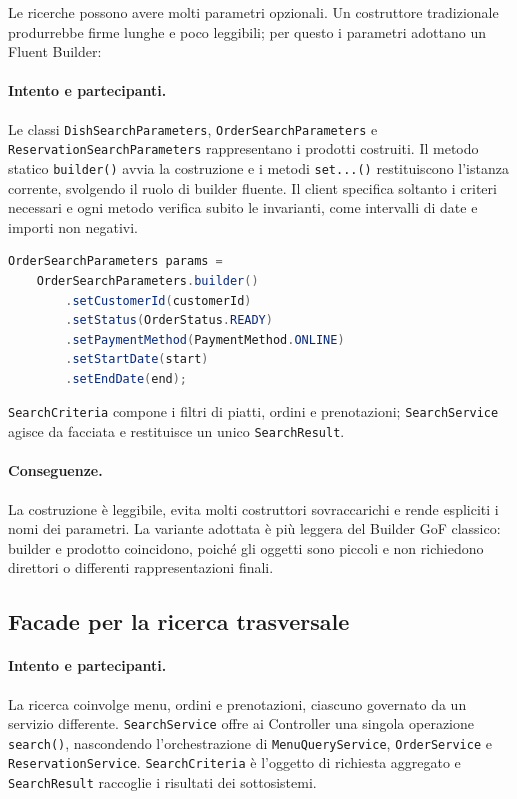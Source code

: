 \documentclass[12pt,a4paper]{article}
\newcommand{\code}[1]{\nolinkurl{#1}}
\begin{document}
Le ricerche possono avere molti parametri opzionali. Un costruttore tradizionale
produrrebbe firme lunghe e poco leggibili; per questo i parametri adottano un
Fluent Builder:

\paragraph{Intento e partecipanti.}
Le classi \code{DishSearchParameters}, \code{OrderSearchParameters} e
\code{ReservationSearchParameters} rappresentano i prodotti costruiti. Il
metodo statico \code{builder()} avvia la costruzione e i metodi \code{set...()}
restituiscono l'istanza corrente, svolgendo il ruolo di builder fluente. Il
client specifica soltanto i criteri necessari e ogni metodo verifica subito le
invarianti, come intervalli di date e importi non negativi.

\begin{lstlisting}[style=codeStyle,language=Java,
caption={Costruzione fluente dei filtri di ricerca.}]
OrderSearchParameters params =
    OrderSearchParameters.builder()
        .setCustomerId(customerId)
        .setStatus(OrderStatus.READY)
        .setPaymentMethod(PaymentMethod.ONLINE)
        .setStartDate(start)
        .setEndDate(end);
\end{lstlisting}

\code{SearchCriteria} compone i filtri di piatti, ordini e prenotazioni;
\code{SearchService} agisce da facciata e restituisce un unico
\code{SearchResult}.

\paragraph{Conseguenze.}
La costruzione è leggibile, evita molti costruttori sovraccarichi e rende
espliciti i nomi dei parametri. La variante adottata è più leggera del Builder
GoF classico: builder e prodotto coincidono, poiché gli oggetti sono piccoli e
non richiedono direttori o differenti rappresentazioni finali.

\subsection{Facade per la ricerca trasversale}

\paragraph{Intento e partecipanti.}
La ricerca coinvolge menu, ordini e prenotazioni, ciascuno governato da un
servizio differente. \code{SearchService} offre ai Controller una singola
operazione \code{search()}, nascondendo l'orchestrazione di
\code{MenuQueryService}, \code{OrderService} e \code{ReservationService}.
\code{SearchCriteria} è l'oggetto di richiesta aggregato e
\code{SearchResult} raccoglie i risultati dei sottosistemi.
\end{document}
